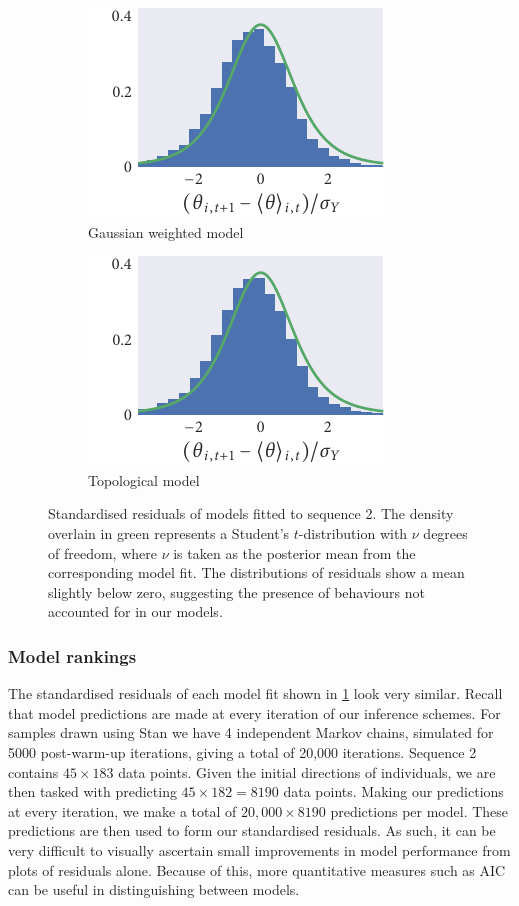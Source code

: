 \begin{figure}[tbp]
\begin{subfigure}[t]{0.33333\textwidth}
  \end{subfigure}%
  \begin{subfigure}[t]{0.33333\textwidth}
    \includegraphics{seq2/gauss_residuals.pdf}
    \caption{Gaussian weighted model}
  \end{subfigure}%
  \begin{subfigure}[t]{0.33333\textwidth}
    \includegraphics{seq2/top_residuals.pdf}
    \caption{Topological model}
  \end{subfigure}
  \caption{Standardised residuals of models fitted to sequence 2. The density
    overlain in green represents a Student's $t$-distribution with $\nu$ degrees
    of freedom, where $\nu$ is taken as the posterior mean from the corresponding
    model fit. The distributions of residuals show a mean slightly below zero,
    suggesting the presence of behaviours not accounted for in our models.}
  \label{fig:residuals_seq2}
\end{figure}

\subsubsection{Model rankings}

The standardised residuals of each model fit shown in \cref{fig:residuals_seq2}
look very similar. Recall that model predictions are made at every iteration of
our inference schemes. For samples drawn using Stan we have 4 independent
Markov chains, simulated for 5000 post-warm-up iterations, giving a total of
20,000 iterations. Sequence 2 contains $45\times183$ data points. Given the
initial directions of individuals, we are then tasked with predicting
$45\times182=8190$ data points. Making our predictions at every iteration, we
make a total of $20,000\times8190$ predictions per model. These predictions are
then used to form our standardised residuals. As such, it can be very difficult
to visually ascertain small improvements in model performance from plots of
residuals alone. Because of this, more quantitative measures such as AIC can be
useful in distinguishing between models.

